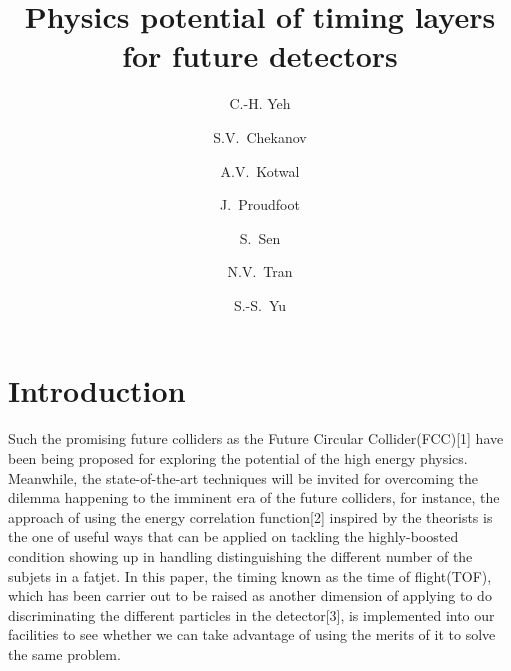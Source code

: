 \documentclass[final,1p,11pt]{elsarticle}
\begin{document}
\begin{frontmatter}

\title{
Physics potential of timing layers for future detectors}

\author[add3]{C.-H. Yeh}

\author[add1]{S.V.~Chekanov}

\author[addDuke]{A.V.~Kotwal}

\author[add1]{J.~Proudfoot}

\author[addDuke]{S.~Sen}

\author[add2]{N.V.~Tran}

\author[add3]{S.-S.~Yu}

\address[add3]{
Department of Physics and Center for High Energy and High Field Physics, 
National Central University, Chung-Li, Taoyuan City 32001, Taiwan
}

\address[add1]{
HEP Division, Argonne National Laboratory,
9700 S.~Cass Avenue,
Argonne, IL 60439, USA. 
}

\address[addDuke]{
Department of Physics, Duke University, USA
}

\address[add2]{
Fermi National Accelerator Laboratory
}




\begin{abstract}

\end{abstract}

\begin{keyword}

\end{keyword}
\end{frontmatter}



\section{Introduction}
Such the promising future colliders as the Future Circular Collider(FCC)[1] have been being proposed for exploring the potential of the high energy physics. Meanwhile, the state-of-the-art techniques will be invited for overcoming the dilemma happening to the imminent era of the future colliders, for instance, the approach of using the energy correlation function[2] inspired by the theorists is the one of useful ways that can be applied on tackling the highly-boosted condition showing up in handling distinguishing the different number of the subjets in a fatjet. In this paper, the timing known as the time of flight(TOF), which has been carrier out to be raised as another dimension of applying to do discriminating the different particles in the detector[3], is implemented into our facilities to see whether we can take advantage of using the merits of it to solve the same problem.\\
\end{document}
